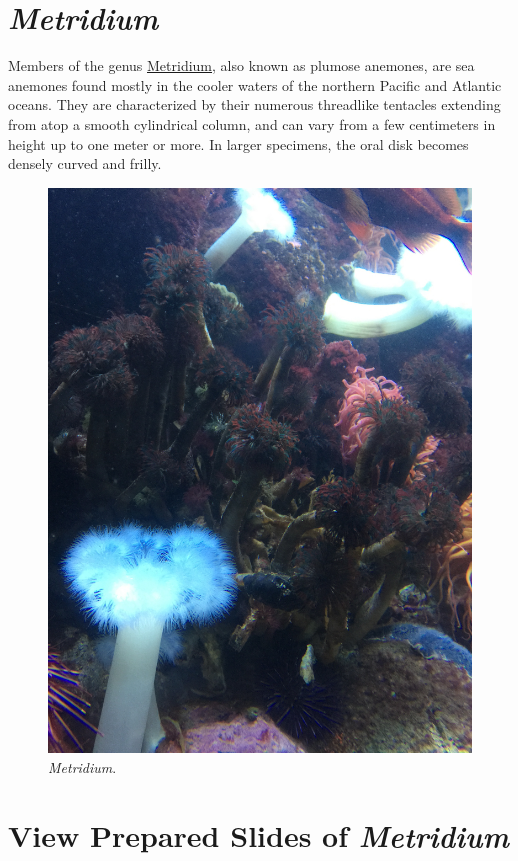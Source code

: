 \section{\texorpdfstring{\emph{Metridium}}{Metridium}}\label{metridium}

Members of the genus
\href{https://en.wikipedia.org/wiki/Metridium}{Metridium}, also known as
plumose anemones, are sea anemones found mostly in the cooler waters of
the northern Pacific and Atlantic oceans. They are characterized by
their numerous threadlike tentacles extending from atop a smooth
cylindrical column, and can vary from a few centimeters in height up to
one meter or more. In larger specimens, the oral disk becomes densely
curved and frilly.

\begin{figure}

{\centering \includegraphics[width=0.7\linewidth]{./figures/porifera/metridium_live}

}

\caption{\emph{Metridium}.}\label{fig:metridum}
\end{figure}

\section{\texorpdfstring{View Prepared Slides of
\emph{Metridium}}{View Prepared Slides of Metridium}}\label{view-prepared-slides-of-metridium}

